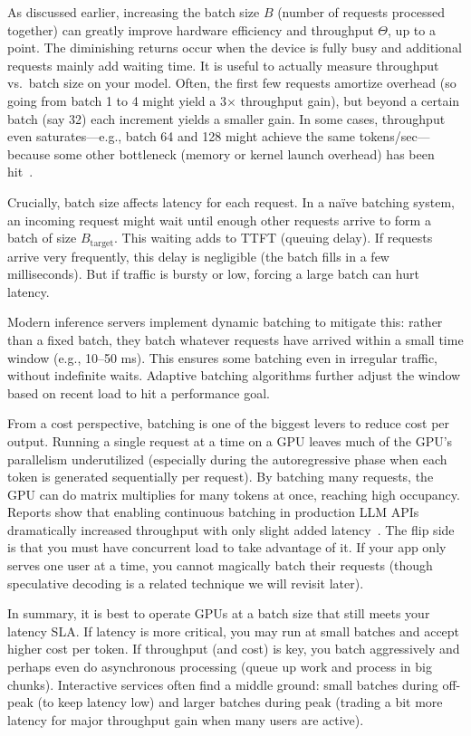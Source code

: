 As discussed earlier, increasing the batch size $B$ (number of requests processed together) can greatly improve hardware efficiency and throughput $\Theta$, up to a point. The diminishing returns occur when the device is fully busy and additional requests mainly add waiting time. It is useful to actually measure throughput vs.\ batch size on your model. Often, the first few requests amortize overhead (so going from batch 1 to 4 might yield a 3$\times$ throughput gain), but beyond a certain batch (say 32) each increment yields a smaller gain. In some cases, throughput even saturates---e.g., batch 64 and 128 might achieve the same tokens/sec---because some other bottleneck (memory or kernel launch overhead) has been hit~\cite{tgi-github,tgi_docs}. 

Crucially, batch size affects latency for each request. In a naïve batching system, an incoming request might wait until enough other requests arrive to form a batch of size $B_{\text{target}}$. This waiting adds to TTFT (queuing delay). If requests arrive very frequently, this delay is negligible (the batch fills in a few milliseconds). But if traffic is bursty or low, forcing a large batch can hurt latency. 

Modern inference servers implement dynamic batching to mitigate this: rather than a fixed batch, they batch whatever requests have arrived within a small time window (e.g., 10–50 ms). This ensures some batching even in irregular traffic, without indefinite waits. Adaptive batching algorithms further adjust the window based on recent load to hit a performance goal.

From a cost perspective, batching is one of the biggest levers to reduce cost per output. Running a single request at a time on a GPU leaves much of the GPU’s parallelism underutilized (especially during the autoregressive phase when each token is generated sequentially per request). By batching many requests, the GPU can do matrix multiplies for many tokens at once, reaching high occupancy. Reports show that enabling continuous batching in production LLM APIs dramatically increased throughput with only slight added latency~\cite{tgi-github,tgi_docs}. The flip side is that you must have concurrent load to take advantage of it. If your app only serves one user at a time, you cannot magically batch their requests (though speculative decoding is a related technique we will revisit later).

In summary, it is best to operate GPUs at a batch size that still meets your latency SLA. If latency is more critical, you may run at small batches and accept higher cost per token. If throughput (and cost) is key, you batch aggressively and perhaps even do asynchronous processing (queue up work and process in big chunks). Interactive services often find a middle ground: small batches during off-peak (to keep latency low) and larger batches during peak (trading a bit more latency for major throughput gain when many users are active).

